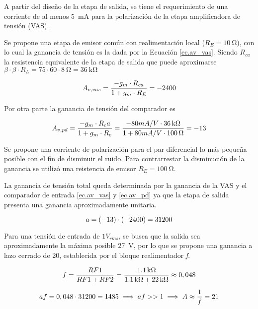 	A partir del diseño de la etapa de salida, se tiene el requerimiento de una corriente de al menos \SI{5}{\milli\ampere} para la polarización de la etapa amplificadora de tensión (VAS).

Se propone una etapa de emisor común con realimentación local ($R_E = \SI{10}{\ohm}$), con lo cual la ganancia de tensión es la dada por la Ecuación \eqref{ec.av_vas}. Siendo $R_{ca}$ la resistencia equivalente de la etapa de salida que puede aproximarse $\beta \cdot \beta \cdot R_L = 75 \cdot 60 \cdot \SI{8}{\ohm} = \SI{36}{\kilo\ohm}$

\begin{equation}
	\centering
	A_{v,vas} = \frac{-g_m \cdot R_{ca}}{1+g_m \cdot R_E} = -2400
	\label{ec.av_vas}
\end{equation}
	

Por otra parte la ganancia de tensión del comparador es

\begin{equation}
	\centering
	A_{v,pd} = \frac{-g_m \cdot R_ca}{1+g_m \cdot R_e} = \frac{-80mA/V \cdot \SI{36}{\kilo\ohm} }{ 1 + 80mA/V \cdot \SI{100}{\ohm} } = -13
	\label{ec.av_pd}
\end{equation}

Se propone una corriente de polarización para el par diferencial lo más pequeña posible con el fin de disminuir el ruido. Para contrarrestar la disminución de la ganancia se utilizó una reistencia de emisor $R_E=\SI{100}{\ohm}$.


La ganancia de tensión total queda determinada por la ganancia de la VAS y el comparador de entrada \eqref{ec.av_vas} y \eqref{ec.av_pd} ya que la etapa de salida presenta una ganancia aproximadamente unitaria.

\begin{equation}
	\centering
	a = (-13) \cdot (-2400) = 31200
	\label{ec.a}
\end{equation}

Para una tensión de entrada de $1V_{rms}$, se busca que la salida sea aproximadamente la máxima posible \SI{27}{\volt}, por lo que se propone una ganancia a lazo cerrado de 20, establecida por el bloque realimentador \textit{f}.

\begin{equation}
	\centering
	f = \frac{RF1}{RF1 + RF2} = \frac{\SI{1.1}{\kilo\ohm}}{\SI{1.1}{\kilo\ohm} + \SI{22}{\kilo\ohm}} \approx 0,048
\end{equation}

\begin{equation}
	\centering
	af = 0,048 \cdot 31200 = 1485 \implies af >> 1 \implies A \approx \frac{1}{f} = 21
\end{equation}

